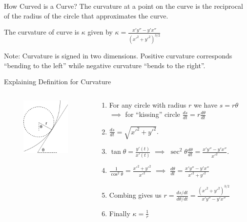 \documentclass{beamer}
\begin{document}
\begin{frame}{How Curved is a Curve?}
	The curvature at a point on the curve is the reciprocal of the radius of the circle that approximates the curve.
	\begin{definition}[Curvature]
		The curvature of curve is $\kappa$ given by
		$\kappa=\frac{x' y'' - y' x''}{(x'^2+y'^2)^{3/2}}$
	\end{definition}
	Note: Curvature is signed in two dimensions. Positive curvature corresponds ``bending to the left'' while negative curvature ``bends to the right''.
\end{frame}

\begin{frame}{Explaining Definition for Curvature}
	\begin{columns}
		\begin{column}{0.4\textwidth}
			\begin{figure}
				\centering
				\includegraphics[width=50mm, scale=0.4]{illustration.png}
			\end{figure}
		\end{column}
		\begin{column}{0.6\textwidth}
			\begin{enumerate}
				\item For any circle with radius $r$ we have $s=r \theta$ $\implies$ for ``kissing'' circle 
				$\frac{ds}{dt} = r \frac{d\theta}{dt}$
				
				\item $\frac{ds}{dt} = \sqrt{x'^2+y'^2}$.
				
				\item $\tan \theta = \frac{y'(t)}{x'(t)}$ $\implies$ $\sec ^2 \theta \frac{d\theta}{dt} = \frac{x' y'' - y' x''}{x'^2}$.
				
				\item $\frac{1}{\cos^2 \theta} = \frac{x'^2+y'^2}{x'^2}$ $\implies$
				$\frac{d\theta}{dt}=\frac{x' y'' - y' x''}{x'^2+y'^2}$
				
				
				
				\item Combing gives us
				$r= \frac{ds/dt}{d\theta/dt} =\frac{(x'^2+y'^2)^{3/2}}{x' y'' - y' x''}$
				
				\item Finally $\kappa = \frac{1}{r}$
				
			\end{enumerate}
			
			
			
		\end{column}
	\end{columns}

	
\end{frame}
\end{document}
